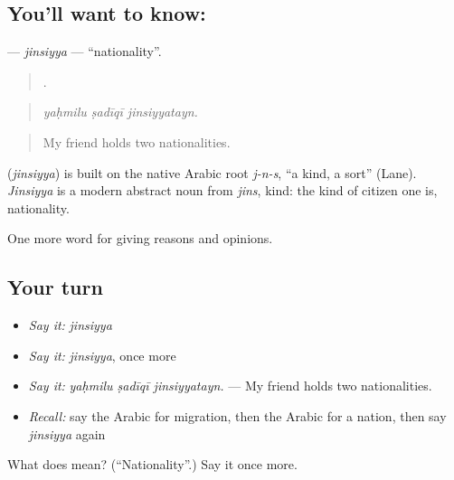 \subsection*{You'll want to know: }
\textbf{} — \emph{jinsiyya} — \textquotedblleft{}nationality\textquotedblright{}.

\begin{quote}
  .
\end{quote}

\begin{quote}
\emph{yaḥmilu ṣadīqī jinsiyyatayn.}
\end{quote}

\begin{quote}
My friend holds two nationalities.
\end{quote}

\begin{cousinweb}
\textbf{} (\emph{jinsiyya}) is built on the native Arabic root \emph{j-n-s}, \textquotedblleft{}a kind, a sort\textquotedblright{} (Lane). \emph{Jinsiyya} is a modern abstract noun from \emph{jins}, kind: the kind of citizen one is, nationality.
\end{cousinweb}

\begin{grammarlens}[title={What you've built}]
One more word for giving reasons and opinions.
\end{grammarlens}

\subsection*{Your turn}
\begin{itemize}
\raggedright
  \item \emph{Say it:} \emph{jinsiyya}
  \item \emph{Say it:} \emph{jinsiyya}, once more
  \item \emph{Say it:} \emph{yaḥmilu ṣadīqī jinsiyyatayn.} — My friend holds two nationalities.
  \item \emph{Recall:} say the Arabic for migration, then the Arabic for a nation, then say \emph{jinsiyya} again
\end{itemize}

\begin{tcolorbox}[breakable,colback=teal!4,colframe=teal!35!black,title={Before you move on}]
What does  mean? (\textquotedblleft{}Nationality\textquotedblright{}.) Say it once more.
\end{tcolorbox}
